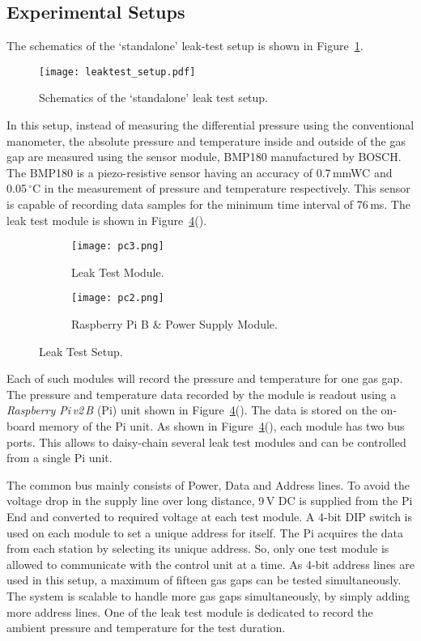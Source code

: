 \subsection{Experimental Setups}
The schematics of the `standalone' leak-test setup is shown in Figure~\ref{fig:schematics}. 
\begin{figure}
  \centering
  \texttt{[image: leaktest\_setup.pdf]}
  \caption{Schematics of the `standalone' leak test setup.}
  \label{fig:schematics}
\end{figure}
In this setup, instead of measuring the differential pressure using the conventional manometer, the absolute pressure and temperature inside and outside of the gas gap are measured using the sensor module, BMP180 manufactured by BOSCH\cite{bmp180}. The BMP180 is a piezo-resistive sensor having an accuracy of 0.7\,mmWC and 0.05\,$^{\circ}$C in the measurement of pressure and temperature respectively. This sensor is capable of recording data samples for the minimum time interval of 76\,ms. The leak test module is shown in Figure~\ref{fig:setup}(). 
\begin{figure}
  \centering
  \begin{subfigure}[b]{0.34\textwidth}
    \texttt{[image: pc3.png]}
    \caption{Leak Test Module.}
    \label{fig:pc3}
  \end{subfigure}
  \begin{subfigure}[b]{0.64\textwidth}
    \texttt{[image: pc2.png]}
    \caption{Raspberry Pi B \& Power Supply Module.}
    \label{fig:pc2}
  \end{subfigure}
  \caption{Leak Test Setup.}
  \label{fig:setup}
\end{figure}
Each of such modules will record the pressure and temperature for one gas gap. The pressure and temperature data recorded by the module is readout using a \textit{Raspberry Pi\,v2\,B} (Pi) unit\cite{rpi} shown in Figure~\ref{fig:setup}(). The data is stored on the on-board memory of the Pi unit. As shown in Figure~\ref{fig:setup}(), each module has two bus ports. This allows to daisy-chain several leak test modules and can be controlled from a single Pi unit.

The common bus mainly consists of Power, Data and Address lines. To avoid the voltage drop in the supply line over long distance, 9\,V DC is supplied from the Pi End and converted to required voltage at each test module. A 4-bit DIP switch is used on each module to set a unique address for itself. The Pi acquires the data from each station by selecting its unique address. So, only one test module is allowed to communicate with the control unit at a time. As 4-bit address lines are used in this setup, a maximum of fifteen gas gaps can be tested simultaneously. The system is scalable to handle more gas gaps simultaneously, by simply adding more address lines. One of the leak test module is dedicated to record the ambient pressure and temperature for the test duration.

